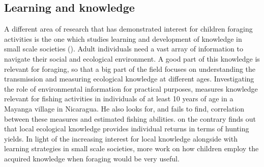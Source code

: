 \subsection{Learning and knowledge}
A different area of research that has demonstrated interest for children foraging activities is the one which studies learning and development of knowledge in small scale societies (\cite{gallois_local_2017, koster_wisdom_2016, lew-levy_how_2017, lew-levy_who_2019, reyes-garcia_adaptive_2016, setalaphruk_childrens_2007}). Adult individuals need a vast array of information to navigate their social and ecological environment. A good part of this knowledge is relevant for foraging, so that a big part of the field focuses on understanding the transmission and measuring ecological knowledge at different ages. Investigating the role of environmental information for practical purposes, \cite{koster_wisdom_2016} measures knowledge relevant for fishing activities in individuals of at least 10 years of age in a Mayanga village in Nicaragua. He also looks for, and fails to find, correlation between these measures and estimated fishing abilities. \cite{reyes-garcia_adaptive_2016} on the contrary finds out that local ecological knowledge provides individual returns in terms of hunting yields. In light of the increasing interest for local knowledge alongside with learning strategies in small scale societies, more work on how children employ the acquired knowledge when foraging would be very useful. 


